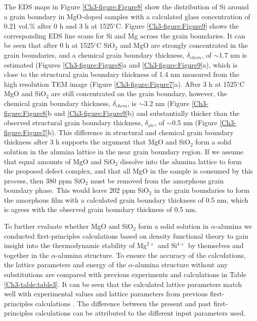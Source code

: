 The EDS maps in Figure \ref{Ch3-figure:Figure8} show the distribution of Si around a grain boundary in MgO-doped samples with a calculated glass concentration of 0.21 vol.\% after 0 h and 3 h at 1525$^{\circ}$C. Figure \ref{Ch3-figure:Figure9} shows the corresponding EDS line scans for Si and Mg across the grain boundaries. It can be seen that after 0 h at 1525$^{\circ}$C SiO$_{2}$ and MgO are strongly concentrated in the grain boundaries, and a chemical grain boundary thickness, $\delta_{chem}$, of $\sim$1.7 nm is estimated (Figures \ref{Ch3-figure:Figure8}a and \ref{Ch3-figure:Figure9}a), which is close to the structural grain boundary thickness of 1.4 nm measured from the high resolution TEM image (Figure \ref{Ch3-figure:Figure7}a). After 3 h at 1525$^{\circ}$C MgO and SiO$_{2}$ are still concentrated on the grain boundary, however, the chemical grain boundary thickness, $\delta_{chem}$, is $\sim$3.2 nm (Figure \ref{Ch3-figure:Figure8}b and \ref{Ch3-figure:Figure9}b) and substantially thicker than the observed structural grain boundary thickness, $\delta_{str}$, of $\sim$0.5 nm (Figure \ref{Ch3-figure:Figure7}b). This difference in structural and chemical grain boundary thickness after 3 h supports the argument that MgO and SiO$_{2}$ form a solid solution in the alumina lattice in the near grain boundary region. If we assume that equal amounts of MgO and SiO$_{2}$ dissolve into the alumina lattice to form the proposed defect complex, and that all MgO in the sample is consumed by this process, then 380 ppm SiO$_{2}$ must be removed from the amorphous grain boundary phase. This would leave 202 ppm SiO$_{2}$ in the grain boundaries to form the amorphous film with a calculated grain boundary thickness of 0.5 nm, which is agrees with the observed grain boundary thickness of 0.5 nm.

To further evaluate whether MgO and SiO$_{2}$ form a solid solution in $\alpha$-alumina we conducted first-principles calculations based on density functional theory to gain insight into the thermodynamic stability of Mg$^{2+}$ and Si$^{4+}$ by themselves and together in the $\alpha$-alumina structure. To ensure the accuracy of the calculations, the lattice parameters and energy of the $\alpha$-alumina structure without any substitutions are compared with previous experiments and calculations in Table \ref{Ch3-table:table3}. It can be seen that the calculated lattice parameters match well with experimental values and lattice parameters from previous first-principles calculations \cite{Jain2013,MaterialsProject,Graham1960_595,Bergerhoff1983,Karlsruhe,Atkinson2003}. The difference between the present and past first-principles calculations can be attributed to the different input parameters used. 

